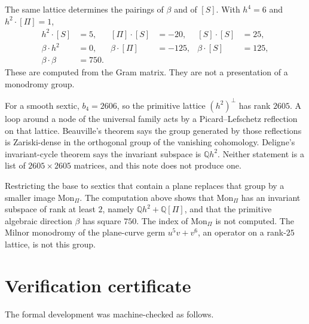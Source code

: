 \documentclass[11pt,a4paper]{article}
\newcommand{\Q}{\mathbb{Q}}
\begin{document}
The same lattice determines the pairings of \(\beta\) and of \([S]\). With \(h^4=6\) and \(h^2\cdot[\Pi]=1\),
\[
\begin{aligned}
h^2\cdot[S]&=5,&
[\Pi]\cdot[S]&=-20,&
[S]\cdot[S]&=25,\\
\beta\cdot h^2&=0,&
\beta\cdot[\Pi]&=-125,&
\beta\cdot[S]&=125,\\
\beta\cdot\beta&=750.&&
\end{aligned}
\]
These are computed from the Gram matrix. They are not a presentation of a monodromy group.

For a smooth sextic, \(b_4=2606\), so the primitive lattice \((h^2)^\perp\) has rank \(2605\). A loop around a node of the universal family acts by a Picard--Lefschetz reflection on that lattice. Beauville's theorem says the group generated by those reflections is Zariski-dense in the orthogonal group of the vanishing cohomology. Deligne's invariant-cycle theorem says the invariant subspace is \(\Q h^2\). Neither statement is a list of \(2605\times 2605\) matrices, and this note does not produce one.

Restricting the base to sextics that contain a plane replaces that group by a smaller image \(\mathrm{Mon}_\Pi\). The computation above shows that \(\mathrm{Mon}_\Pi\) has an invariant subspace of rank at least \(2\), namely \(\Q h^2+\Q[\Pi]\), and that the primitive algebraic direction \(\beta\) has square \(750\). The index of \(\mathrm{Mon}_\Pi\) is not computed. The Milnor monodromy of the plane-curve germ \(u^5v+v^6\), an operator on a rank-\(25\) lattice, is not this group.
\appendix
\section{Verification certificate}\label{app:verification-certificate}

The formal development was machine-checked as follows.
\end{document}
